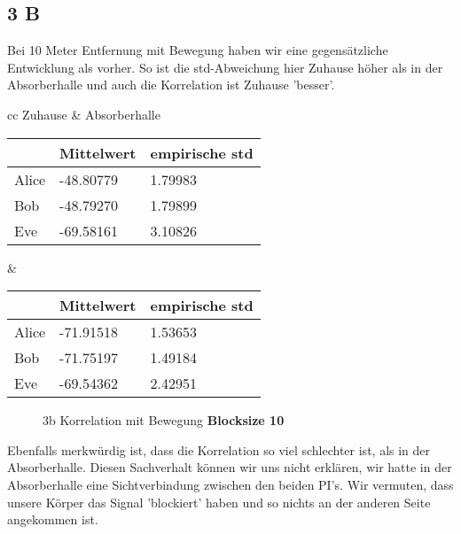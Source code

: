 \documentclass[12pt,a4paper]{article}
\begin{document}
\subsection*{3 B}
Bei 10 Meter Entfernung mit Bewegung haben wir eine gegensätzliche Entwicklung als vorher. So ist die std-Abweichung hier Zuhause höher als in der Absorberhalle und auch die Korrelation ist Zuhause 'besser'.
\begin{table}[H]
\centering
\begin{tabular}{ cc }
Zuhause & Absorberhalle  \\
\begin{tabular}{l|l|l}
& Mittelwert & empirische std \\
\hline
Alice & -48.80779 & 1.79983 \\
\hline
Bob & -48.79270 & 1.79899 \\
\hline
Eve & -69.58161 & 3.10826 \\
\end{tabular} &
\begin{tabular}{l|l|l}
& Mittelwert & empirische std \\
\hline
Alice & -71.91518 & 1.53653 \\
\hline
Bob & -71.75197 & 1.49184 \\
\hline
Eve & -69.54362 & 2.42951 \\
\end{tabular}
\end{tabular}
\end{table}

\begin{figure}[H]
\centering
{}   \qquad
{}
\caption{3b Korrelation mit Bewegung  \textbf{Blocksize 10}}
\label{fig:3b}
\end{figure}
Ebenfalls merkwürdig ist, dass die Korrelation so viel schlechter ist, als in der Absorberhalle. Diesen Sachverhalt können wir uns nicht erklären, wir hatte in der Absorberhalle eine Sichtverbindung zwischen den beiden PI's. Wir vermuten, dass unsere Körper das Signal 'blockiert' haben und so nichts an der anderen Seite angekommen ist. 
\end{document}
